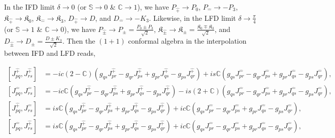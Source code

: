 \documentclass[%
 reprint,
superscriptaddress,
 amsmath,amssymb,
 aps,
]{revtex4-2}
\begin{document}
In the IFD limit $\delta\rightarrow0$ (or $\mathbb{S}\rightarrow0$ \& $\mathbb{C}\rightarrow1$), we have $P_{\hat{+}}\rightarrow P_{0}$, $P_{\hat{-}}\rightarrow -P_{3}$, $\mathfrak{K}_{\hat{+}}\rightarrow \mathfrak{K}_{0}$, $\mathfrak{K}_{\hat{-}}\rightarrow \mathfrak{K}_{3}$, $D_{\hat{+}}\rightarrow D$, and $D_{\hat{-}}\rightarrow -K_{3}$. Likewise, in the LFD limit $\delta\rightarrow\frac{\pi}{4}$ (or $\mathbb{S}\rightarrow1$ \& $\mathbb{C}\rightarrow0$), we have $P_{\hat{\pm}}\rightarrow P_{\pm}=\frac{P_0\pm P_3}{\sqrt{2}}$, $\mathfrak{K}_{\hat{\pm}}\rightarrow \mathfrak{K}_{\pm}=\frac{\mathfrak{K}_0\mp \mathfrak{K}_3}{\sqrt{2}}$, and $D_{\hat{\pm}}\rightarrow D_{\pm}=\frac{D \pm K_3}{\sqrt{2}}$. Then the $(1+1)$ conformal algebra in the interpolation between IFD and LFD reads,
\begin{widetext}
\begin{center}
\begin{align}
    \left[J^{\hat{+}}_{pq},J^{\hat{+}}_{rs}\right] &=-ic(2-\mathbb{C})\left(g_{{q}{s}}J^{\hat{+}}_{{p}{r}}-g_{{q}{r}}J^{\hat{+}}_{{p}{s}}+g_{{p}{r}}J^{\hat{+}}_{{q}{s}}-g_{{p}{s}}J^{\hat{+}}_{{q}{r}}\right)+is\mathbb{C}\left(g_{{q}{s}}J^{\hat{-}}_{{p}{r}}-g_{{q}{r}}J^{\hat{-}}_{{p}{s}}+g_{{p}{r}}J^{\hat{-}}_{{q}{s}}-g_{{p}{s}}J^{\hat{-}}_{{q}{r}}\right),\\
    \left[J^{\hat{-}}_{pq},J^{\hat{-}}_{rs}\right] &=-ic\mathbb{C}\left(g_{{q}{s}}J^{\hat{+}}_{{p}{r}}-g_{{q}{r}}J^{\hat{+}}_{{p}{s}}+g_{{p}{r}}J^{\hat{+}}_{{q}{s}}-g_{{p}{s}}J^{\hat{+}}_{{q}{r}}\right)-is(2+\mathbb{C})\left(g_{{q}{s}}J^{\hat{-}}_{{p}{r}}-g_{{q}{r}}J^{\hat{-}}_{{p}{s}}+g_{{p}{r}}J^{\hat{-}}_{{q}{s}}-g_{{p}{s}}J^{\hat{-}}_{{q}{r}}\right),\\
    \left[J^{\hat{+}}_{pq},J^{\hat{-}}_{rs}\right] &=is\mathbb{C}\left(g_{{q}{s}}J^{\hat{+}}_{{p}{r}}-g_{{q}{r}}J^{\hat{+}}_{{p}{s}}+g_{{p}{r}}J^{\hat{+}}_{{q}{s}}-g_{{p}{s}}J^{\hat{+}}_{{q}{r}}\right)+ic\mathbb{C}\left(g_{{q}{s}}J^{\hat{-}}_{{p}{r}}-g_{{q}{r}}J^{\hat{-}}_{{p}{s}}+g_{{p}{r}}J^{\hat{-}}_{{q}{s}}-g_{{p}{s}}J^{\hat{-}}_{{q}{r}}\right),\\
    \left[J^{\hat{-}}_{pq},J^{\hat{+}}_{rs}\right] &=is\mathbb{C}\left(g_{{q}{s}}J^{\hat{+}}_{{p}{r}}-g_{{q}{r}}J^{\hat{+}}_{{p}{s}}+g_{{p}{r}}J^{\hat{+}}_{{q}{s}}-g_{{p}{s}}J^{\hat{+}}_{{q}{r}}\right)+ic\mathbb{C}\left(g_{{q}{s}}J^{\hat{-}}_{{p}{r}}-g_{{q}{r}}J^{\hat{-}}_{{p}{s}}+g_{{p}{r}}J^{\hat{-}}_{{q}{s}}-g_{{p}{s}}J^{\hat{-}}_{{q}{r}}\right),
\end{align}
\end{center}
\end{widetext}
\end{document}
